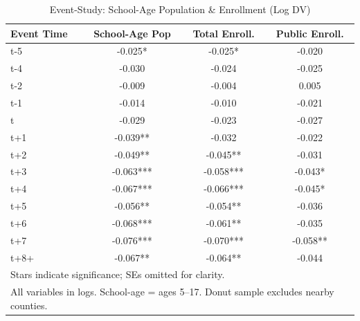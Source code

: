 \begin{table}[htbp]\centering
    \scriptsize
    \caption{Event-Study: School-Age Population \& Enrollment (Log DV)}
    \begin{tabular}{lccc}
    \hline\hline
    Event Time & School-Age Pop & Total Enroll. & Public Enroll. \\
    \hline
    t-5   & -0.025*   & -0.025*   & -0.020    \\
    t-4   & -0.030    & -0.024    & -0.025    \\
    t-2   & -0.009    & -0.004    &  0.005    \\
    t-1   & -0.014    & -0.010    & -0.021    \\
    t     & -0.029    & -0.023    & -0.027    \\
    t+1   & -0.039**  & -0.032    & -0.022    \\
    t+2   & -0.049**  & -0.045**  & -0.031    \\
    t+3   & -0.063*** & -0.058*** & -0.043*   \\
    t+4   & -0.067*** & -0.066*** & -0.045*   \\
    t+5   & -0.056**  & -0.054**  & -0.036    \\
    t+6   & -0.068*** & -0.061**  & -0.035    \\
    t+7   & -0.076*** & -0.070*** & -0.058**  \\
    t+8+  & -0.067**  & -0.064**  & -0.044    \\
    \hline\hline
    \multicolumn{4}{l}{\footnotesize Stars indicate significance; SEs omitted for clarity.} \\
    \multicolumn{4}{l}{\footnotesize All variables in logs. School-age = ages 5--17. Donut sample excludes nearby counties.} \\
    \end{tabular}
    \end{table}
